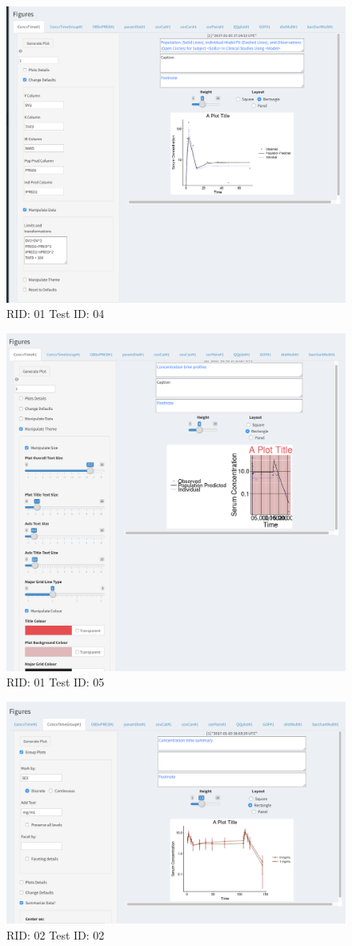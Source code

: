 \begin{figure}[H]
\includegraphics[width=.8\textwidth]{screencaps/01-04-1.png}
\caption{RID: 01 Test ID: 04}
\end{figure}
\begin{figure}[H]
\includegraphics[width=.8\textwidth]{screencaps/01-05-1.png}
\caption{RID: 01 Test ID: 05}
\end{figure}
\begin{figure}[H]
\includegraphics[width=.8\textwidth]{screencaps/02-02-1.png}
\caption{RID: 02 Test ID: 02}
\end{figure}
